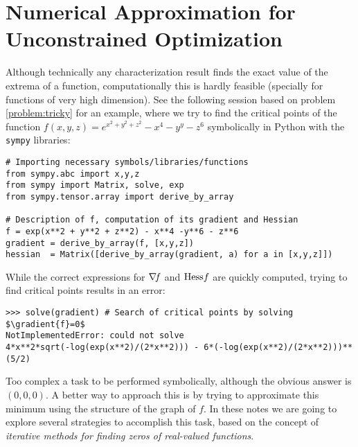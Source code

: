 
\chapter{Numerical Approximation for Unconstrained Optimization}\label{chapter:UnconstrainedNumerical}
Although technically any characterization result finds the exact value of the extrema of a function, computationally this is hardly feasible (specially for functions of very high dimension).  See the following session based on problem \ref{problem:tricky} for an example, where we try to find the critical points of the function $f(x,y,z)=e^{x^2+y^2+z^2}-x^4-y^y-z^6$ symbolically in Python with the \texttt{sympy} libraries:

\begin{verbatim}
# Importing necessary symbols/libraries/functions
from sympy.abc import x,y,z
from sympy import Matrix, solve, exp
from sympy.tensor.array import derive_by_array

# Description of f, computation of its gradient and Hessian
f = exp(x**2 + y**2 + z**2) - x**4 -y**6 - z**6
gradient = derive_by_array(f, [x,y,z])
hessian  = Matrix([derive_by_array(gradient, a) for a in [x,y,z]])
\end{verbatim}
While the correct expressions for $\mathop{\nabla\! {f}}$ and $\mathop{\mathrm{Hess}{f}}$ are quickly computed, trying to find critical points results in an error:
\begin{verbatim}
>>> solve(gradient) # Search of critical points by solving $\gradient{f}=0$
NotImplementedError: could not solve 
4*x**2*sqrt(-log(exp(x**2)/(2*x**2))) - 6*(-log(exp(x**2)/(2*x**2)))**(5/2)
\end{verbatim}

Too complex a task to be performed symbolically, although the obvious answer is $(0,0,0)$.  A better way to approach this is by trying to approximate this minimum using the structure of the graph of $f$.  In these notes we are going to explore several strategies to accomplish this task, based on the concept of \emph{iterative methods for finding zeros of real-valued functions}.





